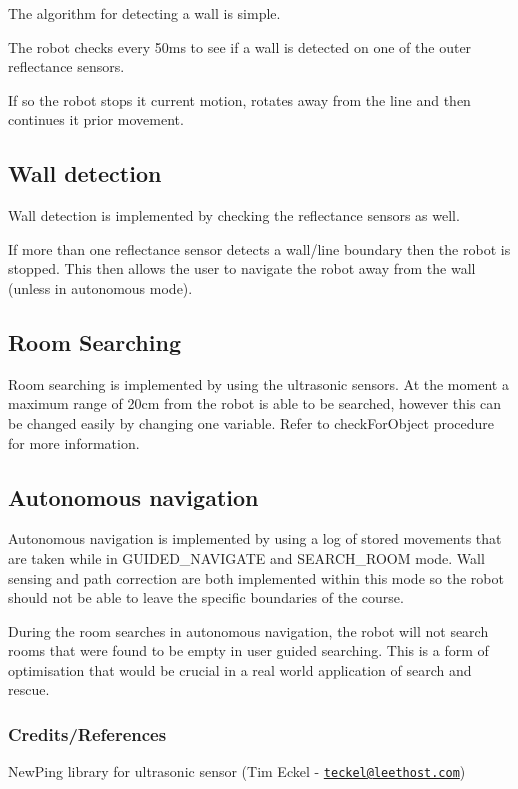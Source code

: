 The algorithm for detecting a wall is simple.

The robot checks every 50ms to see if a wall is detected on one of the outer reflectance sensors.

If so the robot stops it current motion, rotates away from the line and then continues it prior movement.

\subsection*{Wall detection}

Wall detection is implemented by checking the reflectance sensors as well.

If more than one reflectance sensor detects a wall/line boundary then the robot is stopped. This then allows the user to navigate the robot away from the wall (unless in autonomous mode).

\subsection*{Room Searching}

Room searching is implemented by using the ultrasonic sensors. At the moment a maximum range of 20cm from the robot is able to be searched, however this can be changed easily by changing one variable. Refer to check\+For\+Object procedure for more information.

\subsection*{Autonomous navigation}

Autonomous navigation is implemented by using a log of stored movements that are taken while in G\+U\+I\+D\+E\+D\+\_\+\+N\+A\+V\+I\+G\+A\+T\+E and S\+E\+A\+R\+C\+H\+\_\+\+R\+O\+O\+M mode. Wall sensing and path correction are both implemented within this mode so the robot should not be able to leave the specific boundaries of the course.

During the room searches in autonomous navigation, the robot will not search rooms that were found to be empty in user guided searching. This is a form of optimisation that would be crucial in a real world application of search and rescue.

\subsubsection*{Credits/\+References}


\begin{DoxyItemize}
\item New\+Ping library for ultrasonic sensor (Tim Eckel -\/ \href{mailto:teckel@leethost.com}{\tt teckel@leethost.\+com}) 
\end{DoxyItemize}